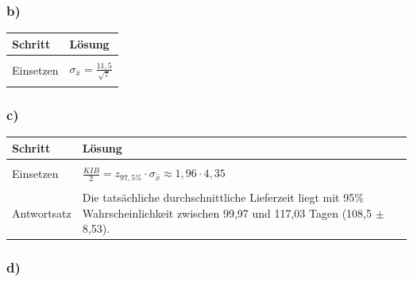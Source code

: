 \documentclass[
  11pt,
  ngerman,
  a4paper,
]{report}
\begin{document}
\hypertarget{b-15}{%
\subsubsection{b)}\label{b-15}}

\begin{table}[H]
\centering
\begin{tabular}{l>{\raggedright\arraybackslash}p{8cm}}
\toprule
\textbf{Schritt} & \textbf{Lösung}\\
\midrule
\cellcolor{gray!6}{Formel} & \cellcolor{gray!6}{$\sigma_{\bar{x}}=\frac{\sigma}{\sqrt{n}}$}\\
Einsetzen & $\sigma_{\bar{x}}=\frac{11{,}5}{\sqrt{7}}$\\
\cellcolor{gray!6}{Ergebnis} & \cellcolor{gray!6}{$\sigma_{\bar{x}}\approx4{,}35$}\\
\bottomrule
\end{tabular}
\end{table}

\hypertarget{c-12}{%
\subsubsection{c)}\label{c-12}}

\begin{table}[H]
\centering
\begin{tabular}{l>{\raggedright\arraybackslash}p{8cm}}
\toprule
\textbf{Schritt} & \textbf{Lösung}\\
\midrule
\cellcolor{gray!6}{Formel} & \cellcolor{gray!6}{$\frac{\mathit{KIB}}{2} = z_{(1-\alpha/2)} \cdot \sigma_{\bar{x}}$}\\
Einsetzen & $\frac{\mathit{KIB}}{2} = z_{97{,}5\%} \cdot \sigma_{\bar{x}} \approx 1{,}96 \cdot 4{,}35$\\
\cellcolor{gray!6}{Ergebnis} & \cellcolor{gray!6}{$\frac{\mathit{KIB}}{2} \approx 8{,}53$}\\
Antwortsatz & Die tatsächliche durchschnittliche Lieferzeit liegt mit 95\% Wahrscheinlichkeit zwischen 99,97 und 117,03 Tagen (108,5 $\pm$ 8,53).\\
\bottomrule
\end{tabular}
\end{table}

\hypertarget{d-6}{%
\subsubsection{d)}\label{d-6}}
\end{document}
